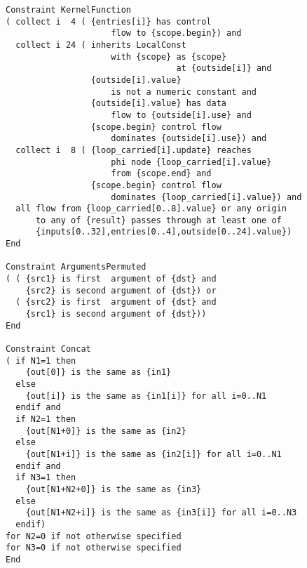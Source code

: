 \begin{figure}[p]
\begin{lstlisting}[language=IDL,basicstyle=\linespread{0.8}\ttfamily,
                   firstnumber=189]
Constraint KernelFunction
( collect i  4 ( {entries[i]} has control
                     flow to {scope.begin}) and
  collect i 24 ( inherits LocalConst
                     with {scope} as {scope}
                                  at {outside[i]} and
                 {outside[i].value}
                     is not a numeric constant and
                 {outside[i].value} has data
                     flow to {outside[i].use} and
                 {scope.begin} control flow
                     dominates {outside[i].use}) and
  collect i  8 ( {loop_carried[i].update} reaches
                     phi node {loop_carried[i].value}
                     from {scope.end} and
                 {scope.begin} control flow
                     dominates {loop_carried[i].value}) and
  all flow from {loop_carried[0..8].value} or any origin
      to any of {result} passes through at least one of
      {inputs[0..32],entries[0..4],outside[0..24].value})
End

Constraint ArgumentsPermuted
( ( {src1} is first  argument of {dst} and
    {src2} is second argument of {dst}) or
  ( {src2} is first  argument of {dst} and
    {src1} is second argument of {dst}))
End

Constraint Concat
( if N1=1 then
    {out[0]} is the same as {in1}
  else
    {out[i]} is the same as {in1[i]} for all i=0..N1
  endif and
  if N2=1 then
    {out[N1+0]} is the same as {in2}
  else
    {out[N1+i]} is the same as {in2[i]} for all i=0..N1
  endif and
  if N3=1 then
    {out[N1+N2+0]} is the same as {in3}
  else
    {out[N1+N2+i]} is the same as {in3[i]} for all i=0..N3
  endif)
for N2=0 if not otherwise specified
for N3=0 if not otherwise specified
End
\end{lstlisting}
\end{figure}